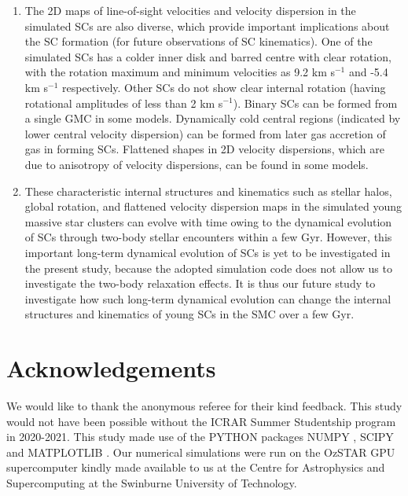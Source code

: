 \documentclass[fleqn,usenatbib]{mnras}
\begin{document}
\begin{enumerate}
    \item The 2D maps of line-of-sight velocities and velocity dispersion in the simulated SCs are also diverse, which provide important implications about the SC formation (for future observations of SC kinematics). One of the simulated SCs has a colder inner disk and barred centre with clear rotation, with the rotation maximum and minimum velocities as 9.2 km s$^{-1}$ and -5.4 km s$^{-1}$ respectively. Other SCs do not show clear internal rotation (having rotational amplitudes of less than 2 km s$^{-1}$). Binary SCs can be formed from a single GMC in some models. Dynamically cold central regions (indicated by lower central velocity dispersion) can be formed from later gas accretion of gas in forming SCs. Flattened shapes in 2D velocity dispersions, which are due to anisotropy of velocity dispersions, can be found in some models.
    
    
    \item These characteristic internal structures and kinematics such as stellar halos, global rotation, and flattened velocity dispersion maps in the simulated young massive star clusters can evolve with time owing to the dynamical evolution of SCs through two-body stellar encounters within a few Gyr. However, this important long-term dynamical evolution of SCs is yet to be investigated in the present study, because the adopted simulation code does not allow us to investigate the  two-body relaxation effects. It is thus our future study to investigate how such long-term dynamical evolution can change the internal structures and kinematics of young SCs in the SMC over a few Gyr.
 \end{enumerate}





\section*{Acknowledgements}


We would like to thank the anonymous referee for their kind feedback. This study would not have been possible without the ICRAR Summer Studentship program in 2020-2021. This study made use of the \textsc{PYTHON} packages \textsc{NUMPY} \citep{van2011numpy}, \textsc{SCIPY} \citep{2020SciPy-NMeth} and \textsc{MATPLOTLIB} \citep{matplotlibHunter:2007}. Our numerical simulations were run on the OzSTAR GPU supercomputer kindly made available to us at the Centre for Astrophysics and Supercomputing at the Swinburne University of Technology.
\end{document}
